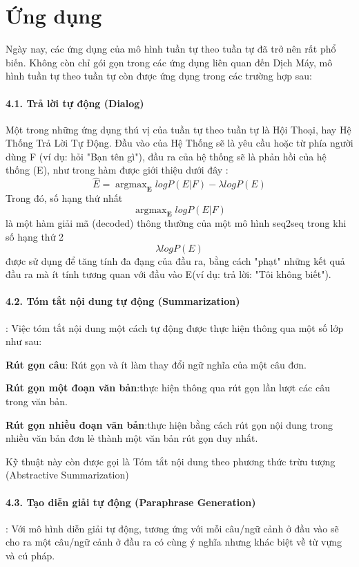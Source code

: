 \section{Ứng dụng}
Ngày nay,  các ứng dụng của mô hình tuần tự theo tuần tự đã trở nên rất phổ biến.  Không còn chỉ gói gọn trong các ứng dụng liên quan đến Dịch Máy, mô hình tuần tự theo tuần tự còn được ứng dụng trong các trường hợp sau:
\paragraph{4.1.  Trả lời tự động (Dialog)}
Một trong những ứng dụng thú vị của tuần tự theo tuần tự là Hội Thoại, hay Hệ Thống Trả Lời Tự Động. Đầu vào của Hệ Thống sẽ là yêu cầu hoặc từ phía người dùng F (ví dụ: hỏi "Bạn tên gì"), đầu ra của hệ thống sẽ là phản hồi của hệ thống (E), như trong hàm được giới thiệu dưới đây :
$$\hat{E}=\mathop{argmax}_{\textbf{E}} log P(E|F) - \lambda logP(E)$$
Trong đó,  số hạng thứ nhất $$\mathop{argmax}_{\textbf{E}} log P(E|F)$$ là một hàm giải mã (decoded) thông thường của một mô hình seq2seq trong khi số hạng thứ 2  $$\lambda logP(E)$$ được sử dụng để tăng tính đa đạng của đầu ra,  bằng cách "phạt" những kết quả  đầu ra mà ít tính tương quan với đầu vào E(ví dụ: trả lời: "Tôi không biết").

\paragraph{4.2.  Tóm tắt nội dung tự động (Summarization)}:
Việc tóm tắt nội dung một cách tự động được thực hiện thông qua một số lớp như sau:

\textbf{Rút gọn câu}: Rút gọn và ít làm thay đổi ngữ nghĩa của một câu đơn.

\textbf{Rút gọn một đoạn văn bản}:thực hiện thông qua rút gọn lần lượt các câu trong văn bản.

\textbf{Rút gọn nhiều đoạn văn bản}:thực hiện bằng cách rút gọn nội dung trong nhiều văn bản đơn lẻ thành một văn bản rút gọn duy nhất.

Kỹ thuật này còn được gọi là Tóm tắt nội dung theo phương thức trừu tượng (Abstractive Summarization)

\paragraph{4.3. Tạo diễn giải tự động (Paraphrase Generation)}: Với mô hình diễn giải tự động,  tương ứng với mỗi câu/ngữ cảnh ở đầu vào sẽ cho ra một câu/ngữ cảnh ở đầu ra có cùng ý nghĩa nhưng khác biệt về từ vựng và cú pháp.

